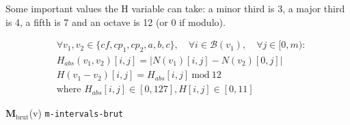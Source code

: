 Some important values the H variable can take: a minor third is 3, a major third is 4, a fifth is 7 and an octave is 12 (or 0 if modulo).

\begin{equation}
\begin{aligned}
    &\forall v_1, v_2 \in \{\mathit{cf}, cp_1, cp_2, a, b, c\}, \quad \forall i \in \mathcal{B}(v_1), \quad \forall j \in [0, m):\\
    &H_{abs}(v_1,v_2)[i, j] = \left|N(v_1)[i, j] - N(v_2)[0,j]\right|\\
    &H(v_1-v_2)[i, j] = H_{abs}[i, j]\ \text{mod}\ 12\\
    &\text{where } H_{abs}[i, j] \in [0, 127], H[i, j] \in [0, 11]
\end{aligned}
\end{equation}

\vspace{.5cm}
\noindent \textbf{M}$_{\text{brut}}$(v) \hspace*{.2cm} \texttt{m-intervals-brut}

